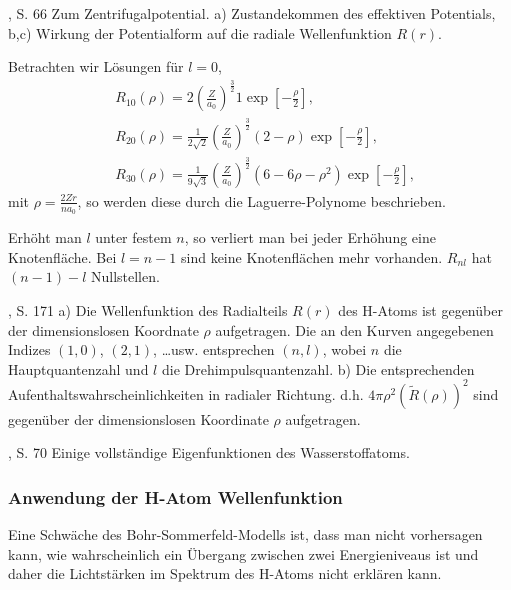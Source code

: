 	{\KuckukAtom, S. 66}
	{Zum Zentrifugalpotential. a) Zustandekommen des effektiven Potentials, b,c)
	Wirkung der Potentialform auf die radiale Wellenfunktion $R(r)$.}
% 

Betrachten wir Lösungen für $l=0$,
\begin{align*}
&R_{10}(\rho) =
2\left(\frac{Z}{a_0}\right)^{\frac{3}{2}} 1 \exp\left[-\frac{\rho}{2} \right],\\
&R_{20}(\rho) = \frac{1}{2\sqrt{2}}\left(\frac{Z}{a_0}\right)^{\frac{3}{2}}
(2-\rho) \exp\left[-\frac{\rho}{2} \right],\\
&R_{30}(\rho) = \frac{1}{9\sqrt{3}}\left(\frac{Z}{a_0}\right)^{\frac{3}{2}}
(6-6\rho-\rho^2) \exp\left[-\frac{\rho}{2} \right],
\end{align*}
mit $\rho = \frac{2Zr}{na_0}$, so werden diese durch die Laguerre-Polynome
beschrieben.

Erhöht man $l$ unter festem $n$, so verliert man bei jeder Erhöhung eine
Knotenfläche. Bei $l=n-1$ sind keine Knotenflächen mehr vorhanden.
$R_{nl}$ hat $(n-1)-l$ Nullstellen.

	{\HakenWolf, S. 171}
	{a) Die Wellenfunktion des Radialteils $R(r)$ des H-Atoms ist gegenüber der
	dimensionslosen Koordnate $\rho$ aufgetragen. Die an den Kurven angegebenen
	Indizes $(1,0)$, $(2,1)$, \ldots usw. entsprechen $(n,l)$, wobei $n$ die
	Hauptquantenzahl und $l$ die Drehimpulsquantenzahl. b) Die entsprechenden
	Aufenthaltswahrscheinlichkeiten in radialer Richtung. d.h. $4\pi \rho^2
	(\tilde{R}(\rho))^2$ sind gegenüber der dimensionslosen Koordinate $\rho$
	aufgetragen.}

	{\KuckukAtom, S. 70}
	{Einige vollständige Eigenfunktionen des Wasserstoffatoms.}


\subsubsection{Anwendung der H-Atom Wellenfunktion}

Eine Schwäche des Bohr-Sommerfeld-Modells ist, dass man nicht vorhersagen
kann, wie wahrscheinlich ein Übergang zwischen zwei Energieniveaus ist und
daher die Lichtstärken im Spektrum des H-Atoms nicht erklären kann.

